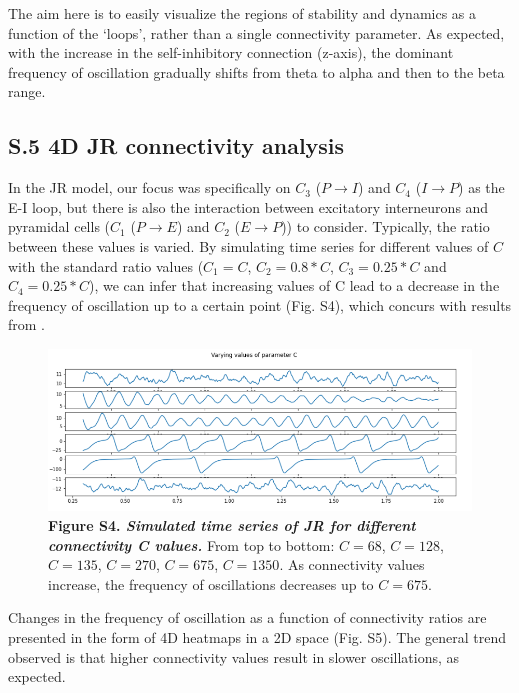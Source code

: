 \documentclass[12pt,twoside]{article}
\begin{document}
The aim here is to easily visualize the regions of stability and dynamics as a function of the `loops', rather than a single connectivity parameter. As expected, with the increase in the self-inhibitory connection (z-axis), the dominant frequency of oscillation gradually shifts from theta to alpha and then to the beta range.


\newpage
\subsection*{S.5 4D JR connectivity analysis}

In the JR model, our focus was specifically on $C_{3}$ ($P \rightarrow I$) and $C_{4}$ ($I \rightarrow P$) as the E-I loop, but there is also the interaction between excitatory interneurons and pyramidal cells ($C_{1}$ ($P \rightarrow E$) and $C_{2}$ ($E \rightarrow P$)) to consider. Typically, the ratio between these values is varied. By simulating time series for different values of $C$ with the standard ratio values ($C_{1}=C$, $C_{2}=0.8*C$, $C_{3}=0.25*C$ and $C_{4}=0.25*C$), we can infer that increasing values of C lead to a decrease in the frequency of oscillation up to a certain point (Fig. S4), which concurs with results from \citet{jansen1995electroencephalogram}. \\

\begin{figure}[H]
    \centering
    \includegraphics[scale=0.75]{Images/JR_Varying_C_time_series.png}
    \caption*{\textbf{Figure S4.  \textit{Simulated time series of JR for different connectivity C values.}} From top to bottom: $C= 68$, $C=128$, $C=135$, $C=270$, $C=675$, $C=1350$. As connectivity values increase, the frequency of oscillations decreases up to $C=675$.}    
    \label{fig:JR_Ctime}
\end{figure}

Changes in the frequency of oscillation as a function of connectivity ratios are presented in the form of 4D heatmaps in a 2D space (Fig. S5). The general trend observed is that higher connectivity values result in slower oscillations, as expected. 
\end{document}
